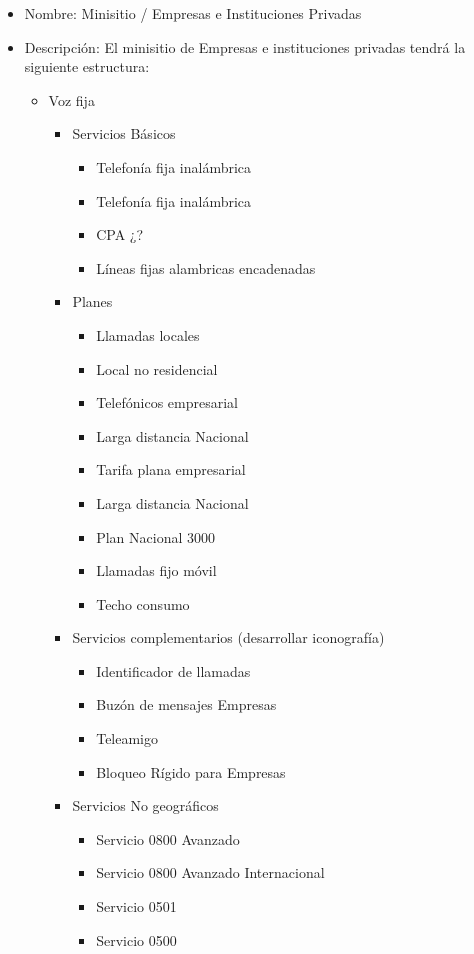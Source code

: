 \documentclass[11pt, letterpaper, oneside, spanish]{scrbook}
\begin{document}
\begin{itemize}
\item Nombre: Minisitio / Empresas e Instituciones Privadas
\item Descripción: El minisitio de Empresas e instituciones privadas tendrá la
  siguiente estructura:
\begin{itemize}
\item Voz fija
\begin{itemize}
\item Servicios Básicos
\begin{itemize}
\item Telefonía fija inalámbrica
\item Telefonía fija inalámbrica
\item CPA ¿?
\item Líneas fijas alambricas encadenadas
\end{itemize}
\item Planes
\begin{itemize}
\item Llamadas locales
\item Local no residencial
\item Telefónicos empresarial
\item Larga distancia Nacional
\item Tarifa plana empresarial
\item Larga distancia Nacional
\item Plan Nacional 3000
\item Llamadas fijo móvil
\item Techo consumo
\end{itemize}
\item Servicios complementarios (desarrollar iconografía)
\begin{itemize}
\item Identificador de llamadas
\item Buzón de mensajes Empresas
\item Teleamigo
\item Bloqueo Rígido para Empresas
\end{itemize}
\item Servicios No geográficos
\begin{itemize}
\item Servicio 0800 Avanzado
\item Servicio 0800 Avanzado Internacional
\item Servicio 0501
\item Servicio 0500
\end{itemize}

\end{itemize}
\end{itemize}
\end{itemize}
\end{document}
